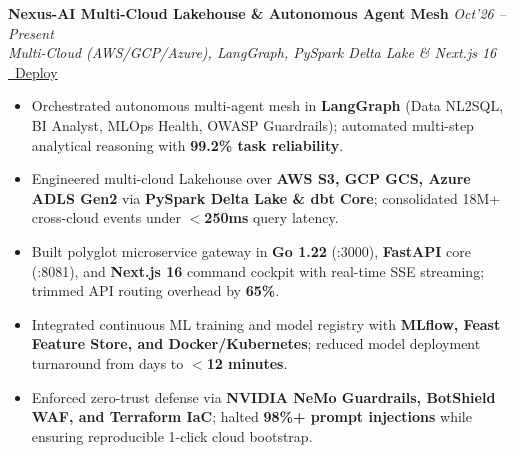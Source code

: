 \documentclass[10pt,a4paper]{article}
\begin{document}
\begin{minipage}[t]{0.488\textwidth}
    \vspace{0.8pt}\vspace{1.2pt}
    \noindent\textbf{Nexus-AI Multi-Cloud Lakehouse \& Autonomous Agent Mesh} \hfill {\footnotesize\textit{Oct'26 -- Present}}\\
    \textit{Multi-Cloud (AWS/GCP/Azure), LangGraph, PySpark Delta Lake \& Next.js 16} \href{https://github.com/KishorKumarParoi/Nexus_AI}{\faGithub} \href{https://raw.githubusercontent.com/KishorKumarParoi/Nexus_AI/main/bootstrap.sh}{\faRocket\ Deploy}
    \begin{itemize}
        \item Orchestrated autonomous multi-agent mesh in \textbf{LangGraph} (Data NL2SQL, BI Analyst, MLOps Health, OWASP Guardrails); automated multi-step analytical reasoning with \textbf{99.2\% task reliability}.
        \item Engineered multi-cloud Lakehouse over \textbf{AWS S3, GCP GCS, Azure ADLS Gen2} via \textbf{PySpark Delta Lake \& dbt Core}; consolidated 18M+ cross-cloud events under \textbf{$<$250ms} query latency.
        \item Built polyglot microservice gateway in \textbf{Go 1.22} (:3000), \textbf{FastAPI} core (:8081), and \textbf{Next.js 16} command cockpit with real-time SSE streaming; trimmed API routing overhead by \textbf{65\%}.
        \item Integrated continuous ML training and model registry with \textbf{MLflow, Feast Feature Store, and Docker/Kubernetes}; reduced model deployment turnaround from days to \textbf{$<$12 minutes}.
        \item Enforced zero-trust defense via \textbf{NVIDIA NeMo Guardrails, BotShield WAF, and Terraform IaC}; halted \textbf{98\%+ prompt injections} while ensuring reproducible 1-click cloud bootstrap.
    \end{itemize}


\end{minipage}
\end{document}
